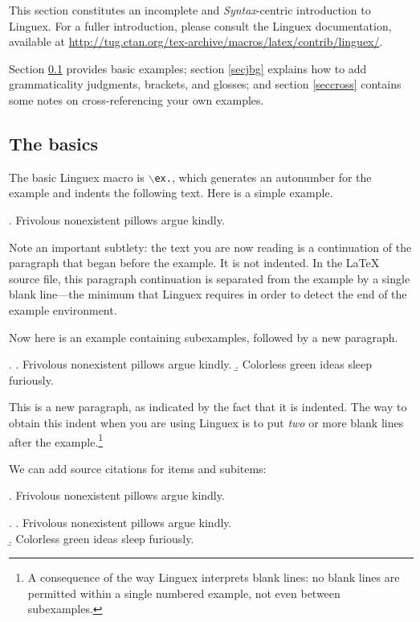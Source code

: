 \documentclass[letterpaper,12pt, twoside]{article}
\begin{document}
This section constitutes an incomplete and \emph{Syntax}-centric introduction to {Linguex}. For a fuller introduction, please consult the {Linguex} documentation, available at {\href{http://tug.ctan.org/tex-archive/macros/latex/contrib/linguex/}{http://tug.ctan.org/tex-archive/macros/latex/contrib/linguex/}}.

Section \ref{secbasics} provides basic examples; section \ref{secjbg} explains how to add grammaticality judgments, brackets, and glosses; and section \ref{seccross} contains some notes on cross-referencing your own examples.

\subsection{The basics}\label{secbasics}
The basic {Linguex} macro is \texttt{$\backslash$ex.}, which generates an autonumber for the example and indents the following text. Here is a simple example.

\ex. Frivolous nonexistent pillows argue kindly.

Note an important subtlety: the text you are now reading is a continuation of the paragraph that began before the example. It is not indented. In the LaTeX source file, this paragraph continuation is separated from the example by a single blank line---the minimum that {Linguex} requires in order to detect the end of the example environment. 

Now here is an example containing subexamples, followed by a new paragraph.

\ex. 
\a. Frivolous nonexistent pillows argue kindly.
\b. Colorless green ideas sleep furiously.


This is a new paragraph, as indicated by the fact that it is indented. The way to obtain this indent when you are using {Linguex} is to put \emph{two} or more blank lines after the example.\footnote{A consequence of the way {Linguex} interprets blank lines: no blank lines are permitted within a single numbered example, not even between subexamples.} 

We can add source citations for items and subitems:

\ex. Frivolous nonexistent pillows argue kindly.\\\citep{journalarticle}

\ex. 
\a. Frivolous nonexistent pillows argue kindly. \\\citep{journalarticle}
\b. Colorless green ideas sleep furiously.\\\citep{book}
\end{document}
